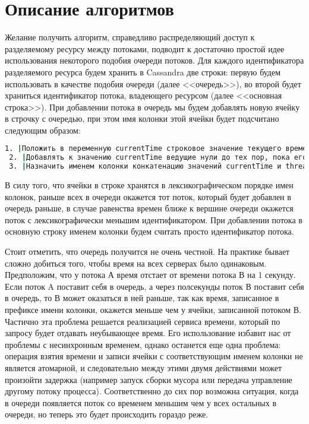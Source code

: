 \section{Описание алгоритмов}

Желание получить алгоритм, справедливо распределяющий доступ к разделяемому ресурсу между потоками, подводит к достаточно простой идее использования некоторого подобия очереди потоков.
Для каждого идентификатора разделяемого ресурса будем хранить в Cassandra две строки: первую будем использовать в качестве подобия очереди (далее <<очередь>>), во второй будет храниться идентификатор потока, владеющего ресурсом (далее <<основная строка>>).
При добавлении потока в очередь мы будем добавлять новую ячейку в строчку с очередью, при этом имя колонки этой ячейки будет подсчитано следующим образом:

\begin{lstlisting}[language=csh,caption={Определение имени колонки для ячейки в очереди}]
 1. |Положить в переменную currentTime строковое значение текущего времени в микросекундах|
 2. |Добавлять к значению currentTime ведущие нули до тех пор, пока его длина не станет равной 20|
 3. |Назначить именем колонки конкатенацию значений currentTime и threadId|
\end{lstlisting}

В силу того, что ячейки в строке хранятся в лексикографическом порядке имен колонок, раньше всех в очереди окажется тот поток, который будет добавлен в очередь раньше, в случае равенства времен ближе к вершине очереди окажется поток с лексикографически меньшим идентификатором.
При добавлении потока в основную строку именем колонки будем считать просто идентификатор потока.

Стоит отметить, что очередь получится не очень честной. На практике бывает сложно добиться того, чтобы время на всех серверах было одинаковым. Предположим, что у потока А время отстает от времени потока В на 1 секунду. Если поток A поставит себя в очередь, а через полсекунды поток В поставит себя в очередь, то В может оказаться в ней раньше, так как время, записанное в префиксе имени колонки, окажется меньше чем у ячейки, записанной потоком В. Частично эта проблема решается реализацией сервиса времени, который по запросу будет отдавать неубывающее время. Его использование избавит нас от проблемы с несинхронным временем, однако останется еще одна проблема: операция взятия времени и записи ячейки с соответствующим именем колонки не является атомарной, и следовательно между этими двумя действиями может произойти задержка (например запуск сборки мусора или передача управление другому потоку процесса). Соответственно до сих пор возможна ситуация, когда в очереди появляется поток со временем меньшим чем у всех остальных в очереди, но теперь это будет происходить гораздо реже.









